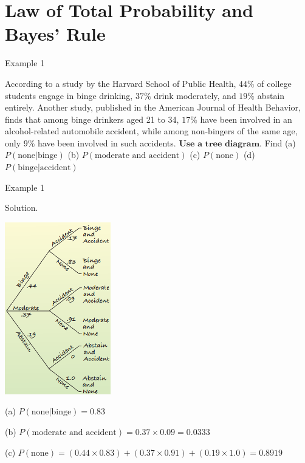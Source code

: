 \documentclass[
  ignorenonframetext,
]{beamer}
\begin{document}
\hypertarget{law-of-total-probability-and-bayes-rule}{%
\section{Law of Total Probability and Bayes'
Rule}\label{law-of-total-probability-and-bayes-rule}}

\begin{frame}{Example 1}
\protect\hypertarget{example-1-1}{}
\begin{tcolorbox}

According to a study by the Harvard School of Public Health, $44\%$ of college students engage in binge drinking, $37\%$ drink moderately, and $19\%$ abstain entirely. Another study, published in the American Journal of Health Behavior, finds that among binge drinkers aged 21 to 34, $17\%$ have been involved in an alcohol-related automobile accident, while among non-bingers of the same age, only $9\%$ have been involved in such accidents. $\textbf{Use a tree diagram}$. Find (a) $P(\text{none|binge})$ (b) $P(\text{moderate and accident})$ (c) $P(\text{none})$
(d) $P(\text{binge|accident})$
\end{tcolorbox}
\end{frame}

\begin{frame}{Example 1}
\protect\hypertarget{example-1-2}{}
\begin{tcolorbox}
Solution. 


\begin{center}\includegraphics[width=0.3\linewidth,height=0.5\textheight]{week8_7} \end{center}

(a) $P(\text{none|binge})=0.83$

(b) $P(\text{moderate and accident})=0.37\times 0.09=0.0333$

(c) $P(\text{none})=(0.44\times0.83)+(0.37\times0.91)+(0.19\times1.0)=0.8919$


\end{tcolorbox}
\end{frame}
\end{document}
